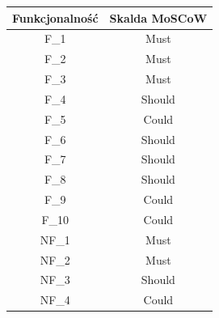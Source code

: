 \documentclass[12pt,titlepage]{article}
\begin{document}
    \begin{center}
        \begin{table}[!h]
            \centering
            \begin{tabular}{|c|c|}
                \hline
                \textbf{Funkcjonalność} & \textbf{Skalda MoSCoW} \\ \hline
                F\_1                    & Must                   \\ \hline
                F\_2                    & Must                   \\ \hline
                F\_3                    & Must                   \\ \hline
                F\_4                    & Should                 \\ \hline
                F\_5                    & Could                  \\ \hline
                F\_6                    & Should                 \\ \hline
                F\_7                    & Should                 \\ \hline
                F\_8                    & Should                 \\ \hline
                F\_9                    & Could                  \\ \hline
                F\_10                   & Could                  \\ \hline
                NF\_1                   & Must                   \\ \hline
                NF\_2                   & Must                   \\ \hline
                NF\_3                   & Should                 \\ \hline
                NF\_4                   & Could                  \\ \hline
            \end{tabular}
        \end{table}
    \end{center}

    
\end{document}
